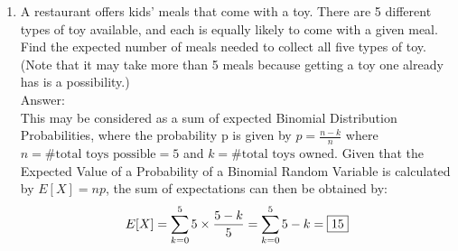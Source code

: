 \documentclass{article}
\begin{document}
\begin{enumerate}
\begin{enumerate}
    
            \end{enumerate}
            \clearpage
            \item   A restaurant offers kids' meals that come with a toy. There are 5 different types of toy available,
                    and each is equally likely to come with a given meal. Find the expected number of meals needed to 
                    collect all five types of toy. (Note that it may take more than 5 meals because getting a toy one 
                    already has is a possibility.)
                    \\Answer:\\
                    This may be considered as a sum of expected Binomial Distribution Probabilities, 
                    where the probability p is given by $p = \frac{n-k}{n}$ where \\
                    $ n = \text{\# total toys possible} = 5$ and $k = \text{\# total toys owned}$. Given that the Expected 
                    Value of a Probability of a Binomial Random Variable is calculated by
                    $E[X]=np$, the sum of expectations can then be obtained by:
                    $$ E[X] = \sum_{k=0}^{5} 5\times\frac{5-k}{5}=\sum_{k=0}^{5}5-k = \fbox{15} $$


\end{enumerate}
\end{document}
